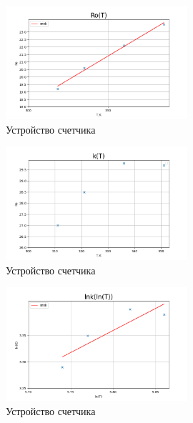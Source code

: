\documentclass[a4paper]{article}
\begin{document}
\begin{figure}
    \centering
    \includegraphics[width=0.6\textwidth]{rt.png}
    \caption{Устройство счетчика}
\end{figure}

\begin{figure}
    \centering
    \includegraphics[width=0.6\textwidth]{kt.png}
    \caption{Устройство счетчика}
\end{figure}


\begin{figure}
    \centering
    \includegraphics[width=0.6\textwidth]{ln.png}
    \caption{Устройство счетчика}
\end{figure}
\end{document}
